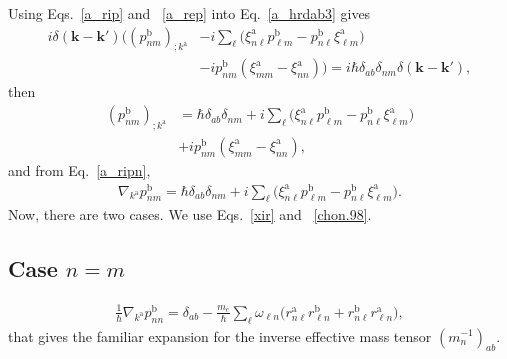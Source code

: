 Using Eqs.~\eqref{a_rip} and ~\eqref{a_rep}
into Eq.~\eqref{a_hrdab3} gives
\begin{align}\label{a_rapb}
i\delta(\mathbf{k}-\mathbf{k}')
\bigg(
(p^{\mathrm{b}}_{nm})_{;k^{\mathrm{a}}}
&
-i
\sum_{\ell}
\bigg(
\xi^{\mathrm{a}}_{n\ell}
p^{\mathrm{b}}_{\ell m}
-
p^{\mathrm{b}}_{n\ell}
\xi^{\mathrm{a}}_{\ell m}
\bigg)
\nonumber \\
&
-i
p^{\mathrm{b}}_{nm}(\xi^{\mathrm{a}}_{mm}
-
\xi^{\mathrm{a}}_{nn}
)
\bigg)
=
i\hbar\delta_{ab}\delta_{nm}\delta(\mathbf{k}-\mathbf{k}')
,
\end{align}
then
\begin{align}\label{a_rapb2}
(p^{\mathrm{b}}_{nm})_{;k^{\mathrm{a}}}&=
\hbar\delta_{ab}\delta_{nm}
+i
\sum_{\ell}
\bigg(
\xi^{\mathrm{a}}_{n\ell}
p^{\mathrm{b}}_{\ell m}
-
p^{\mathrm{b}}_{n\ell}
\xi^{\mathrm{a}}_{\ell m}
\bigg)
\nonumber \\
&+i
p^{\mathrm{b}}_{nm}(\xi^{\mathrm{a}}_{mm}
-
\xi^{\mathrm{a}}_{nn}
)
,
\end{align}
and from Eq.~\eqref{a_ripn},
\begin{align}\label{cogno}
\nabla_{k^{\mathrm{a}}}p^{\mathrm{b}}_{nm}=
\hbar\delta_{ab}\delta_{nm}
+i
\sum_{\ell}
\bigg(
\xi^{\mathrm{a}}_{n\ell}
p^{\mathrm{b}}_{\ell m}
-
p^{\mathrm{b}}_{n\ell}
\xi^{\mathrm{a}}_{\ell m}
\bigg)
.
\end{align}
Now, there are two cases. We use Eqs.~\eqref{xir} and ~\eqref{chon.98}.

\subsection{Case \texorpdfstring{$n=m$}{n=m}}
\begin{align}\label{tita}
\frac{1}{\hbar}\nabla_{k^{\mathrm{a}}}p^{\mathrm{b}}_{nn}=
\delta_{ab}
-\frac{m_e}{\hbar}
\sum_{\ell}
\omega_{\ell n}
\bigg(
r^{\mathrm{a}}_{n\ell}
r^{\mathrm{b}}_{\ell n}
+
r^{\mathrm{b}}_{n\ell}
r^{\mathrm{a}}_{\ell n}
\bigg)
,
\end{align}
that gives the familiar expansion for the inverse effective mass
tensor $(m_n^{-1})_{ab}$.\cite{ashcroftbook}

